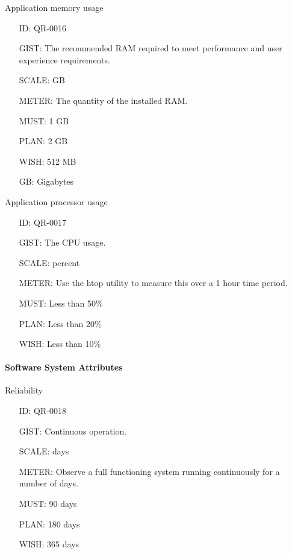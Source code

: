         Application memory usage

        \begin{itemize}
          \setlength{\itemindent}{.5in}
          \itemsep .15em
          \item[ID:] QR-0016
          \item[GIST:] The recommended RAM required to meet performance and user
            experience requirements.
          \item[SCALE:] GB
          \item[METER:] The quantity of the installed RAM.
          \item[MUST:] 1 GB
          \item[PLAN:] 2 GB
          \item[WISH:] 512 MB
          \item[GB:] Gigabytes
        \end{itemize}

        Application processor usage

        \begin{itemize}
          \setlength{\itemindent}{.5in}
          \itemsep .15em
          \item[ID:] QR-0017
          \item[GIST:] The CPU usage.
          \item[SCALE:] percent
          \item[METER:] Use the htop utility to measure this over a 1 hour time
            period.
          \item[MUST:] Less than 50\%
          \item[PLAN:] Less than 20\%
          \item[WISH:] Less than 10\%
        \end{itemize}

      \paragraph{Software System Attributes}

        Reliability

        \begin{itemize}
          \setlength{\itemindent}{.5in}
          \itemsep .15em
          \item[ID:] QR-0018
          \item[GIST:] Continuous operation.
          \item[SCALE:] days
          \item[METER:] Observe a full functioning system running continuously
            for a number of days.
          \item[MUST:] 90 days
          \item[PLAN:] 180 days
          \item[WISH:] 365 days
        \end{itemize}

